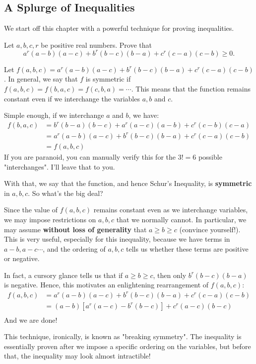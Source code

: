 \documentclass[../main.tex]{subfiles}
\begin{document}
\subsection{A Splurge of Inequalities}
We start off this chapter with a powerful technique for proving inequalities.
\begin{example}\label{algebra-schur}
Let $a,b,c,r$ be positive real numbers. Prove that
$$a^r(a-b)(a-c)+b^r(b-c)(b-a)+c^r(c-a)(c-b)\geq 0.$$
\end{example}
Let $f(a,b,c)=a^r(a-b)(a-c)+b^r(b-c)(b-a)+c^r(c-a)(c-b)$. In general, we say that $f$ is symmetric if $f(a,b,c)=f(b,a,c)=f(c,b,a)=\cdots$. This means that the function remains constant even if we interchange the variables $a,b$ and $c$.

Simple enough, if we interchange $a$ and $b$, we have:
\begin{align*}
    f(b,a,c)&=b^r(b-a)(b-c)+a^r(a-c)(a-b)+c^r(c-b)(c-a) \\
    &=a^r(a-b)(a-c)+b^r(b-c)(b-a)+c^r(c-a)(c-b) \\
    &=f(a,b,c)
\end{align*}
If you are paranoid, you can manually verify this for the $3!=6$ possible "interchanges". I'll leave that to you.

With that, we say that the function, and hence Schur's Inequality, is \textbf{symmetric} in $a,b,c$. So what's the big deal?

Since the value of $f(a,b,c)$ remains constant even as we interchange variables, we may impose restrictions on $a,b,c$ that we normally cannot. In particular, we may assume \textbf{without loss of generality} that $a\geq b\geq c$ (convince yourself!). This is very useful, especially for this inequality, because we have terms in $a-b, a-c \cdots$, and the ordering of $a,b,c$ tells us whether these terms are positive or negative.

In fact, a cursory glance tells us that if $a\geq b \geq c$, then only $b^r(b-c)(b-a)$ is negative. Hence, this motivates an enlightening rearrangement of $f(a,b,c)$:
\begin{align*}
    f(a,b,c)&= a^r(a-b)(a-c)+b^r(b-c)(b-a)+c^r(c-a)(c-b)\\
            &= (a-b)[a^r(a-c)-b^r(b-c)]+c^r(a-c)(b-c) \\
\end{align*}
And we are done!
\begin{moral}
This technique, ironically, is known as "breaking symmetry". The inequality is essentially proven after we impose a specific ordering on the variables, but before that, the inequality may look almost intractible!
\end{moral}
\end{document}
